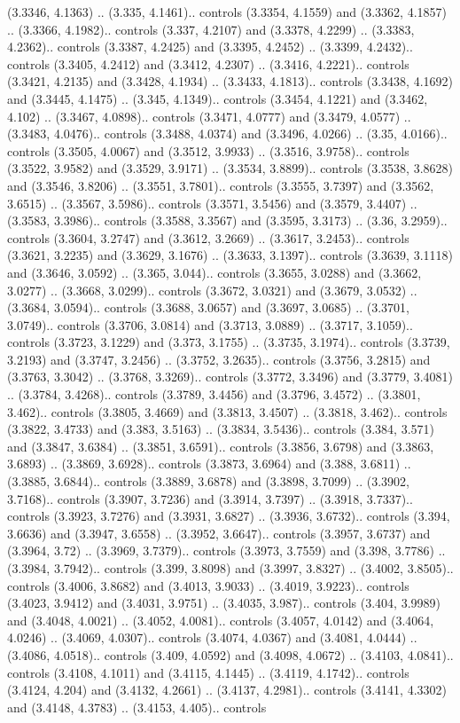 (3.3346, 4.1363) .. (3.335, 4.1461).. controls (3.3354, 4.1559) and (3.3362, 4.1857) .. (3.3366, 4.1982).. controls (3.337, 4.2107) and (3.3378, 4.2299) .. (3.3383, 4.2362).. controls (3.3387, 4.2425) and (3.3395, 4.2452) .. (3.3399, 4.2432).. controls (3.3405, 4.2412) and (3.3412, 4.2307) .. (3.3416, 4.2221).. controls (3.3421, 4.2135) and (3.3428, 4.1934) .. (3.3433, 4.1813).. controls (3.3438, 4.1692) and (3.3445, 4.1475) .. (3.345, 4.1349).. controls (3.3454, 4.1221) and (3.3462, 4.102) .. (3.3467, 4.0898).. controls (3.3471, 4.0777) and (3.3479, 4.0577) .. (3.3483, 4.0476).. controls (3.3488, 4.0374) and (3.3496, 4.0266) .. (3.35, 4.0166).. controls (3.3505, 4.0067) and (3.3512, 3.9933) .. (3.3516, 3.9758).. controls (3.3522, 3.9582) and (3.3529, 3.9171) .. (3.3534, 3.8899).. controls (3.3538, 3.8628) and (3.3546, 3.8206) .. (3.3551, 3.7801).. controls (3.3555, 3.7397) and (3.3562, 3.6515) .. (3.3567, 3.5986).. controls (3.3571, 3.5456) and (3.3579, 3.4407) .. (3.3583, 3.3986).. controls (3.3588, 3.3567) and (3.3595, 3.3173) .. (3.36, 3.2959).. controls (3.3604, 3.2747) and (3.3612, 3.2669) .. (3.3617, 3.2453).. controls (3.3621, 3.2235) and (3.3629, 3.1676) .. (3.3633, 3.1397).. controls (3.3639, 3.1118) and (3.3646, 3.0592) .. (3.365, 3.044).. controls (3.3655, 3.0288) and (3.3662, 3.0277) .. (3.3668, 3.0299).. controls (3.3672, 3.0321) and (3.3679, 3.0532) .. (3.3684, 3.0594).. controls (3.3688, 3.0657) and (3.3697, 3.0685) .. (3.3701, 3.0749).. controls (3.3706, 3.0814) and (3.3713, 3.0889) .. (3.3717, 3.1059).. controls (3.3723, 3.1229) and (3.373, 3.1755) .. (3.3735, 3.1974).. controls (3.3739, 3.2193) and (3.3747, 3.2456) .. (3.3752, 3.2635).. controls (3.3756, 3.2815) and (3.3763, 3.3042) .. (3.3768, 3.3269).. controls (3.3772, 3.3496) and (3.3779, 3.4081) .. (3.3784, 3.4268).. controls (3.3789, 3.4456) and (3.3796, 3.4572) .. (3.3801, 3.462).. controls (3.3805, 3.4669) and (3.3813, 3.4507) .. (3.3818, 3.462).. controls (3.3822, 3.4733) and (3.383, 3.5163) .. (3.3834, 3.5436).. controls (3.384, 3.571) and (3.3847, 3.6384) .. (3.3851, 3.6591).. controls (3.3856, 3.6798) and (3.3863, 3.6893) .. (3.3869, 3.6928).. controls (3.3873, 3.6964) and (3.388, 3.6811) .. (3.3885, 3.6844).. controls (3.3889, 3.6878) and (3.3898, 3.7099) .. (3.3902, 3.7168).. controls (3.3907, 3.7236) and (3.3914, 3.7397) .. (3.3918, 3.7337).. controls (3.3923, 3.7276) and (3.3931, 3.6827) .. (3.3936, 3.6732).. controls (3.394, 3.6636) and (3.3947, 3.6558) .. (3.3952, 3.6647).. controls (3.3957, 3.6737) and (3.3964, 3.72) .. (3.3969, 3.7379).. controls (3.3973, 3.7559) and (3.398, 3.7786) .. (3.3984, 3.7942).. controls (3.399, 3.8098) and (3.3997, 3.8327) .. (3.4002, 3.8505).. controls (3.4006, 3.8682) and (3.4013, 3.9033) .. (3.4019, 3.9223).. controls (3.4023, 3.9412) and (3.4031, 3.9751) .. (3.4035, 3.987).. controls (3.404, 3.9989) and (3.4048, 4.0021) .. (3.4052, 4.0081).. controls (3.4057, 4.0142) and (3.4064, 4.0246) .. (3.4069, 4.0307).. controls (3.4074, 4.0367) and (3.4081, 4.0444) .. (3.4086, 4.0518).. controls (3.409, 4.0592) and (3.4098, 4.0672) .. (3.4103, 4.0841).. controls (3.4108, 4.1011) and (3.4115, 4.1445) .. (3.4119, 4.1742).. controls (3.4124, 4.204) and (3.4132, 4.2661) .. (3.4137, 4.2981).. controls (3.4141, 4.3302) and (3.4148, 4.3783) .. (3.4153, 4.405).. controls 